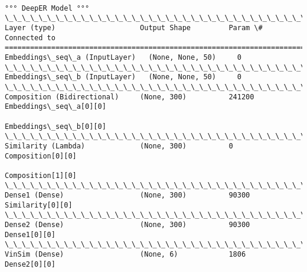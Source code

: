 \documentclass[11pt]{article}
\begin{document}
    \begin{Verbatim}[commandchars=\\\{\}]

°°° DeepER Model °°°
\_\_\_\_\_\_\_\_\_\_\_\_\_\_\_\_\_\_\_\_\_\_\_\_\_\_\_\_\_\_\_\_\_\_\_\_\_\_\_\_\_\_\_\_\_\_\_\_\_\_\_\_\_\_\_\_\_\_\_\_\_\_\_\_\_\_\_\_\_\_\_\_\_\_\_\_\_\_\_\_\_\_\_\_\_\_\_\_\_\_\_\_\_\_\_\_\_\_
Layer (type)                    Output Shape         Param \#     Connected to                     
==================================================================================================
Embeddings\_seq\_a (InputLayer)   (None, None, 50)     0                                            
\_\_\_\_\_\_\_\_\_\_\_\_\_\_\_\_\_\_\_\_\_\_\_\_\_\_\_\_\_\_\_\_\_\_\_\_\_\_\_\_\_\_\_\_\_\_\_\_\_\_\_\_\_\_\_\_\_\_\_\_\_\_\_\_\_\_\_\_\_\_\_\_\_\_\_\_\_\_\_\_\_\_\_\_\_\_\_\_\_\_\_\_\_\_\_\_\_\_
Embeddings\_seq\_b (InputLayer)   (None, None, 50)     0                                            
\_\_\_\_\_\_\_\_\_\_\_\_\_\_\_\_\_\_\_\_\_\_\_\_\_\_\_\_\_\_\_\_\_\_\_\_\_\_\_\_\_\_\_\_\_\_\_\_\_\_\_\_\_\_\_\_\_\_\_\_\_\_\_\_\_\_\_\_\_\_\_\_\_\_\_\_\_\_\_\_\_\_\_\_\_\_\_\_\_\_\_\_\_\_\_\_\_\_
Composition (Bidirectional)     (None, 300)          241200      Embeddings\_seq\_a[0][0]           
                                                                 Embeddings\_seq\_b[0][0]           
\_\_\_\_\_\_\_\_\_\_\_\_\_\_\_\_\_\_\_\_\_\_\_\_\_\_\_\_\_\_\_\_\_\_\_\_\_\_\_\_\_\_\_\_\_\_\_\_\_\_\_\_\_\_\_\_\_\_\_\_\_\_\_\_\_\_\_\_\_\_\_\_\_\_\_\_\_\_\_\_\_\_\_\_\_\_\_\_\_\_\_\_\_\_\_\_\_\_
Similarity (Lambda)             (None, 300)          0           Composition[0][0]                
                                                                 Composition[1][0]                
\_\_\_\_\_\_\_\_\_\_\_\_\_\_\_\_\_\_\_\_\_\_\_\_\_\_\_\_\_\_\_\_\_\_\_\_\_\_\_\_\_\_\_\_\_\_\_\_\_\_\_\_\_\_\_\_\_\_\_\_\_\_\_\_\_\_\_\_\_\_\_\_\_\_\_\_\_\_\_\_\_\_\_\_\_\_\_\_\_\_\_\_\_\_\_\_\_\_
Dense1 (Dense)                  (None, 300)          90300       Similarity[0][0]                 
\_\_\_\_\_\_\_\_\_\_\_\_\_\_\_\_\_\_\_\_\_\_\_\_\_\_\_\_\_\_\_\_\_\_\_\_\_\_\_\_\_\_\_\_\_\_\_\_\_\_\_\_\_\_\_\_\_\_\_\_\_\_\_\_\_\_\_\_\_\_\_\_\_\_\_\_\_\_\_\_\_\_\_\_\_\_\_\_\_\_\_\_\_\_\_\_\_\_
Dense2 (Dense)                  (None, 300)          90300       Dense1[0][0]                     
\_\_\_\_\_\_\_\_\_\_\_\_\_\_\_\_\_\_\_\_\_\_\_\_\_\_\_\_\_\_\_\_\_\_\_\_\_\_\_\_\_\_\_\_\_\_\_\_\_\_\_\_\_\_\_\_\_\_\_\_\_\_\_\_\_\_\_\_\_\_\_\_\_\_\_\_\_\_\_\_\_\_\_\_\_\_\_\_\_\_\_\_\_\_\_\_\_\_
VinSim (Dense)                  (None, 6)            1806        Dense2[0][0]                     

\end{Verbatim}
\end{document}

